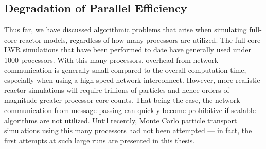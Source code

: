 \subsection{Degradation of Parallel Efficiency}

Thus far, we have discussed algorithmic problems that arise when simulating
full-core reactor models, regardless of how many processors are utilized. The
full-core LWR simulations that have been performed to date
\cite{sna-leppanen-2010, physor-kelly-2012} have generally used under 1000
processors. With this many processors, overhead from network communication is
generally small compared to the overall computation time, especially when using
a high-speed network interconnect. However, more realistic reactor simulations
will require trillions of particles and hence orders of magnitude greater
processor core counts. That being the case, the network communication from
message-passing can quickly become prohibitive if scalable algorithms are not
utilized. Until recently, Monte Carlo particle transport simulations using this
many processors had not been attempted --- in fact, the first attempts at such
large runs are presented in this thesis.

